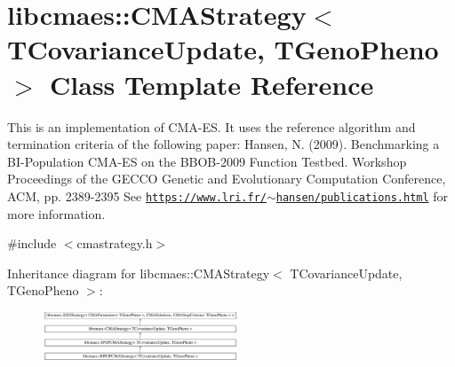 \hypertarget{classlibcmaes_1_1CMAStrategy}{\section{libcmaes\-:\-:C\-M\-A\-Strategy$<$ T\-Covariance\-Update, T\-Geno\-Pheno $>$ Class Template Reference}
\label{classlibcmaes_1_1CMAStrategy}
}


This is an implementation of C\-M\-A-\/\-E\-S. It uses the reference algorithm and termination criteria of the following paper\-: Hansen, N. (2009). Benchmarking a B\-I-\/\-Population C\-M\-A-\/\-E\-S on the B\-B\-O\-B-\/2009 Function Testbed. Workshop Proceedings of the G\-E\-C\-C\-O Genetic and Evolutionary Computation Conference, A\-C\-M, pp. 2389-\/2395 See \href{https://www.lri.fr/~hansen/publications.html}{\tt https\-://www.\-lri.\-fr/$\sim$hansen/publications.\-html} for more information.  




{\ttfamily \#include $<$cmastrategy.\-h$>$}

Inheritance diagram for libcmaes\-:\-:C\-M\-A\-Strategy$<$ T\-Covariance\-Update, T\-Geno\-Pheno $>$\-:\begin{figure}[H]
\begin{center}
\leavevmode
\includegraphics[height=1.429301cm]{classlibcmaes_1_1CMAStrategy}
\end{center}
\end{figure}
